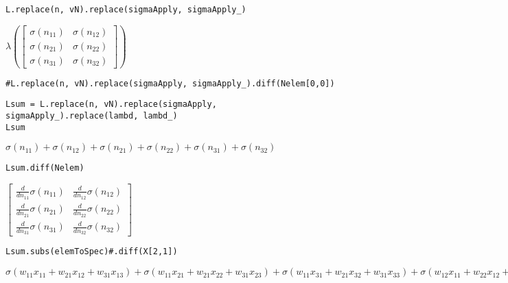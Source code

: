 \documentclass[
]{article}
\begin{document}
\begin{verbatim}
L.replace(n, vN).replace(sigmaApply, sigmaApply_)
\end{verbatim}

\(\displaystyle \lambda{\left(\left[\begin{matrix}\sigma{\left(n_{11} \right)} & \sigma{\left(n_{12} \right)}\\\sigma{\left(n_{21} \right)} & \sigma{\left(n_{22} \right)}\\\sigma{\left(n_{31} \right)} & \sigma{\left(n_{32} \right)}\end{matrix}\right] \right)}\)

\begin{verbatim}
#L.replace(n, vN).replace(sigmaApply, sigmaApply_).diff(Nelem[0,0])
\end{verbatim}

\begin{verbatim}
Lsum = L.replace(n, vN).replace(sigmaApply, sigmaApply_).replace(lambd, lambd_)
Lsum
\end{verbatim}

\(\displaystyle \sigma{\left(n_{11} \right)} + \sigma{\left(n_{12} \right)} + \sigma{\left(n_{21} \right)} + \sigma{\left(n_{22} \right)} + \sigma{\left(n_{31} \right)} + \sigma{\left(n_{32} \right)}\)

\begin{verbatim}
Lsum.diff(Nelem)
\end{verbatim}

\(\displaystyle \left[\begin{matrix}\frac{d}{d n_{11}} \sigma{\left(n_{11} \right)} & \frac{d}{d n_{12}} \sigma{\left(n_{12} \right)}\\\frac{d}{d n_{21}} \sigma{\left(n_{21} \right)} & \frac{d}{d n_{22}} \sigma{\left(n_{22} \right)}\\\frac{d}{d n_{31}} \sigma{\left(n_{31} \right)} & \frac{d}{d n_{32}} \sigma{\left(n_{32} \right)}\end{matrix}\right]\)

\begin{verbatim}
Lsum.subs(elemToSpec)#.diff(X[2,1])
\end{verbatim}

\(\displaystyle \sigma{\left(w_{11} x_{11} + w_{21} x_{12} + w_{31} x_{13} \right)} + \sigma{\left(w_{11} x_{21} + w_{21} x_{22} + w_{31} x_{23} \right)} + \sigma{\left(w_{11} x_{31} + w_{21} x_{32} + w_{31} x_{33} \right)} + \sigma{\left(w_{12} x_{11} + w_{22} x_{12} + w_{32} x_{13} \right)} + \sigma{\left(w_{12} x_{21} + w_{22} x_{22} + w_{32} x_{23} \right)} + \sigma{\left(w_{12} x_{31} + w_{22} x_{32} + w_{32} x_{33} \right)}\)
\end{document}
